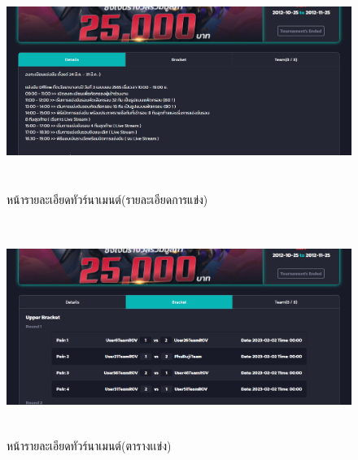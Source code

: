     \begin{figure}[ht]
      \begin{center}
      \includegraphics[width=18cm,height=7cm,keepaspectratio]{tournament_each_rule.png}
      \end{center}
      \caption[หน้ารายละเอียดทัวร์นาเมนต์(รายละเอียดการแข่ง)]{หน้ารายละเอียดทัวร์นาเมนต์(รายละเอียดการแข่ง)}
      \label{fig:หน้ารายละเอียดทัวร์นาเมนต์(รายละเอียดการแข่ง)}
    \end{figure}
    \begin{figure}[ht]
      \begin{center}
      \includegraphics[width=18cm,height=7cm,keepaspectratio]{tournament_each_bracket.png}
      \end{center}
      \caption[หน้ารายละเอียดทัวร์นาเมนต์(ตารางเเข่ง)]{หน้ารายละเอียดทัวร์นาเมนต์(ตารางเเข่ง)}
      \label{fig:หน้ารายละเอียดทัวร์นาเมนต์(ตารางเเข่ง)}
    \end{figure}
